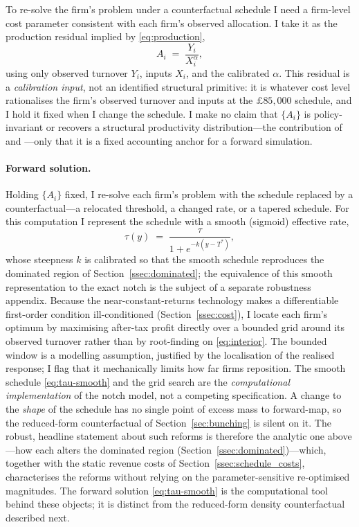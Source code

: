 To re-solve the firm's problem under a counterfactual schedule I need a
firm-level cost parameter consistent with each firm's observed allocation. I
take it as the production residual implied by \eqref{eq:production},
\begin{equation}
  A_i \;=\; \frac{Y_i}{X_i^{\alpha}},
  \label{eq:recover}
\end{equation}
using only observed turnover $Y_i$, inputs $X_i$, and the calibrated $\alpha$.
This residual is a \emph{calibration input}, not an identified structural
primitive: it is whatever cost level rationalises the firm's observed turnover
and inputs at the $\pounds85{,}000$ schedule, and I hold it fixed when I change
the schedule. I make no claim that $\{A_i\}$ is policy-invariant or recovers a
structural productivity distribution---the contribution of
\citet{garicano2016} and \citet{gourioroys2014}---only that it is a fixed
accounting anchor for a forward simulation.

\paragraph{Forward solution.} Holding $\{A_i\}$ fixed, I re-solve each firm's
problem with the schedule replaced by a counterfactual---a relocated threshold, a
changed rate, or a tapered schedule. For this computation I represent the
schedule with a smooth (sigmoid) effective rate,
\begin{equation}
  \tau(y) \;=\; \frac{\tau}{1+e^{-k(y-T^{*})}},
  \label{eq:tau-smooth}
\end{equation}
whose steepness $k$ is calibrated so that the smooth schedule reproduces the
dominated region of Section~\ref{ssec:dominated}; the equivalence of this smooth
representation to the exact notch is the subject of a separate robustness
appendix. Because the near-constant-returns technology makes a differentiable
first-order condition ill-conditioned (Section~\ref{ssec:cost}), I locate each
firm's optimum by maximising after-tax profit directly over a bounded grid
around its observed turnover rather than by root-finding on \eqref{eq:interior}.
The bounded window is a modelling assumption, justified by the localisation of
the realised response; I flag that it mechanically limits how far firms
reposition. The smooth schedule \eqref{eq:tau-smooth} and the grid search are the
\emph{computational implementation} of the notch model, not a competing
specification. A change to the \emph{shape} of the schedule has no single point of
excess mass to forward-map, so the reduced-form counterfactual of
Section~\ref{sec:bunching} is silent on it. The robust, headline statement about
such reforms is therefore the analytic one above---how each alters the dominated
region (Section~\ref{ssec:dominated})---which, together with the static revenue
costs of Section~\ref{ssec:schedule_costs}, characterises the reforms without
relying on the parameter-sensitive re-optimised magnitudes. The forward solution
\eqref{eq:tau-smooth} is the computational tool behind these objects; it is
distinct from the reduced-form density counterfactual described next.


